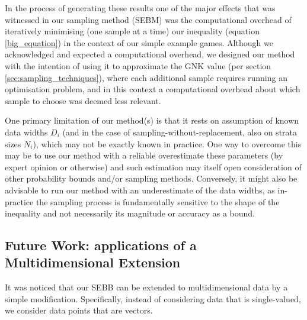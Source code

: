 In the process of generating these results one of the major effects that was witnessed in our sampling method (SEBM) was the computational overhead of iteratively minimising (one sample at a time) our inequality (equation \ref{big_equation}) in the context of our simple example games.
Although we acknowledged and expected a computational overhead, we designed our method with the intention of using it to approximate the GNK value (per section \ref{sec:sampling_techniques}), where each additional sample requires running an optimisation problem, and in this context a computational overhead about which sample to choose was deemed less relevant.


% 

One primary limitation of our method(s) is that it rests on assumption of known data widths $D_i$ (and in the case of sampling-without-replacement, also on strata sizes $N_i$), which may not be exactly known in practice.
One way to overcome this may be to use our method with a reliable overestimate these parameters (by expert opinion or otherwise) and such estimation may itself open consideration of other probability bounds and/or sampling methods.
Conversely, it might also be advisable to run our method with an underestimate of the data widths, as in-practice the sampling process is fundamentally sensitive to the shape of the inequality and not necessarily its magnitude or accuracy as a bound.








\subsection{Future Work: applications of a Multidimensional Extension}\label{sec:multi}

It was noticed that our SEBB can be extended to multidimensional data by a simple modification.
Specifically, instead of considering data that is single-valued, we consider data points that are vectors. 

